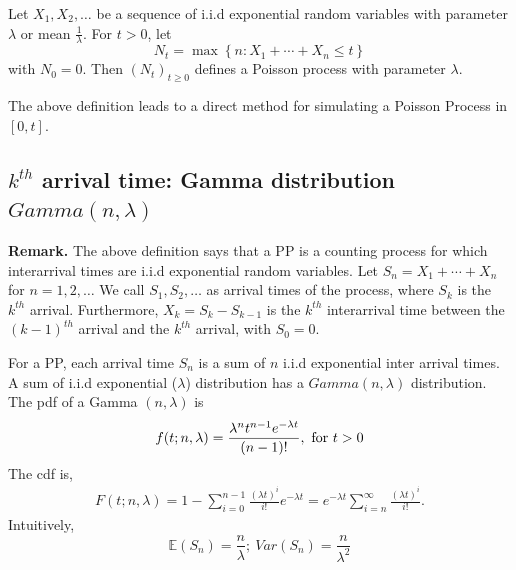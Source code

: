 \documentclass[11pt]{elegantbook}
\begin{document}
\begin{definition}[Definition 2 of PP]
        Let $X_1, X_2, \ldots$ be a sequence of i.i.d exponential random variables with parameter $\lambda$ or mean $\frac{1}{\lambda}$. For $t>0$, let
        $$
        N_t=\max \left\{n: X_1+\cdots+X_n \leq t\right\}
        $$
        with $N_0=0$. Then $\left(N_t\right)_{t \geq 0}$ defines a Poisson process with parameter $\lambda$.
\end{definition}
\begin{claim}[ Simulation 1.]
    The above definition leads to a direct method for simulating a Poisson Process in $[0, t]$.
\end{claim}

\subsection{$k^{th}$ arrival time: Gamma distribution $Gamma(n,\lambda)$}

\textbf{Remark.} The above definition says that a PP is a counting process for which interarrival times are i.i.d exponential random variables. Let $S_n=X_1+\cdots+X_n$ for $n=1,2, \ldots$ We call $S_1, S_2, \ldots$ as arrival times of the process, where $S_k$ is the $k^{th}$ arrival. Furthermore, $X_k=S_k-S_{k-1}$ is the $k^{th}$ interarrival time between the $(k-1)^{th}$ arrival and the $k^{th}$ arrival, with $S_0=0$.

For a PP, each arrival time $S_n$ is a sum of $n$ i.i.d exponential inter arrival times. A sum of i.i.d exponential ($\lambda$) distribution has a $Gamma(n, \lambda)$ distribution. The pdf of a Gamma $(n, \lambda)$ is $$f(t;n,\lambda)=\frac{\lambda^n t^{n-1}e^{-\lambda t}}{(n-1)!},\ \textnormal{for } t>0$$
The cdf is,
\begin{equation}
    \begin{aligned}
        {\displaystyle F(t;n ,\lambda )=1-\sum _{i=0}^{n -1}{\frac {(\lambda t)^{i}}{i!}}e^{-\lambda t}=e^{-\lambda t}\sum _{i=n }^{\infty }{\frac {(\lambda t)^{i}}{i!}}.}
    \end{aligned}
    \nonumber
\end{equation}
Intuitively,
$$\mathbb{E}(S_n)=\frac{n}{\lambda};\ Var(S_n)=\frac{n}{\lambda^2}$$
\end{document}
